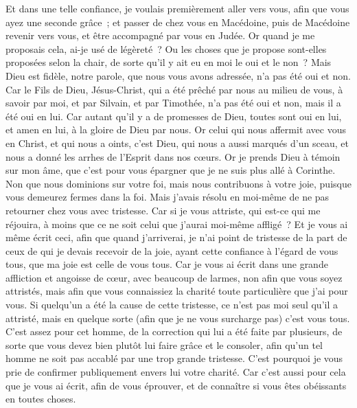\begin{multicols}{2}
Et dans une telle confiance, je voulais premièrement aller vers vous, afin que vous ayez une seconde grâce~;
et passer de chez vous en Macédoine, puis de Macédoine revenir vers vous, et être accompagné par vous en Judée.
Or quand je me proposais cela, ai-je usé de légèreté~? Ou les choses que je propose sont-elles proposées selon la chair, de sorte qu'il y ait eu en moi le oui et le non~?
Mais Dieu est fidèle, notre parole, que nous vous avons adressée, n'a pas été oui et non.
Car le Fils de Dieu, Jésus-Christ, qui a été prêché par nous au milieu de vous, à savoir par moi, et par Silvain, et par Timothée, n'a pas été oui et non, mais il a été oui en lui.
Car autant qu'il y a de promesses de Dieu, toutes sont oui en lui, et amen en lui, à la gloire de Dieu par nous.
Or celui qui nous affermit avec vous en Christ, et qui nous a oints, c'est Dieu,
qui nous a aussi marqués d'un sceau, et nous a donné les arrhes de l'Esprit dans nos cœurs.
Or je prends Dieu à témoin sur mon âme, que c'est pour vous épargner que je ne suis plus allé à Corinthe.
Non que nous dominions sur votre foi, mais nous contribuons à votre joie, puisque vous demeurez fermes dans la foi.
\VerseOne{}Mais j'avais résolu en moi-même de ne pas retourner chez vous avec tristesse.
Car si je vous attriste, qui est-ce qui me réjouira, à moins que ce ne soit celui que j'aurai moi-même affligé~?
Et je vous ai même écrit ceci, afin que quand j'arriverai, je n'ai point de tristesse de la part de ceux de qui je devais recevoir de la joie, ayant cette confiance à l'égard de vous tous, que ma joie est celle de vous tous.
Car je vous ai écrit dans une grande affliction et angoisse de cœur, avec beaucoup de larmes, non afin que vous soyez attristés, mais afin que vous connaissiez la charité toute particulière que j'ai pour vous.
Si quelqu'un a été la cause de cette tristesse, ce n'est pas moi seul qu'il a attristé, mais en quelque sorte (afin que je ne vous surcharge pas) c'est vous tous.
C'est assez pour cet homme, de la correction qui lui a été faite par plusieurs,
de sorte que vous devez bien plutôt lui faire grâce et le consoler, afin qu'un tel homme ne soit pas accablé par une trop grande tristesse.
C'est pourquoi je vous prie de confirmer publiquement envers lui votre charité.
Car c'est aussi pour cela que je vous ai écrit, afin de vous éprouver, et de connaître si vous êtes obéissants en toutes choses.

\end{multicols}
